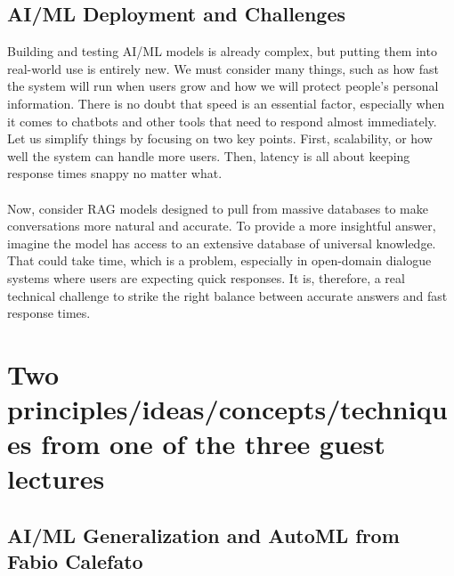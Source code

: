 \documentclass[11pt]{article}
\begin{document}
\subsection{AI/ML Deployment and Challenges}

Building and testing AI/ML models is already complex, but putting them into real-world use is entirely new. We must consider many things, such as how fast the system will run when users grow and how we will protect people's personal information. There is no doubt that speed is an essential factor, especially when it comes to chatbots and other tools that need to respond almost immediately. Let us simplify things by focusing on two key points. First, scalability, or how well the system can handle more users. Then, latency is all about keeping response times snappy no matter what. \\\\
Now, consider RAG models designed to pull from massive databases to make conversations more natural and accurate. To provide a more insightful answer, imagine the model has access to an extensive database of universal knowledge. That could take time, which is a problem, especially in open-domain dialogue systems where users are expecting quick responses. It is, therefore, a real technical challenge to strike the right balance between accurate answers and fast response times.

\section{Two principles/ideas/concepts/techniques from one of the three guest lectures}

\subsection{AI/ML Generalization and AutoML from Fabio Calefato}
\end{document}
